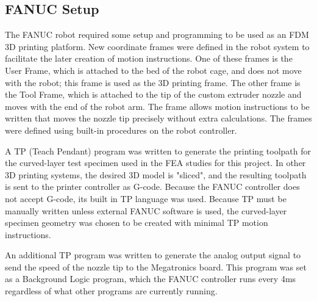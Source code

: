 \subsection*{FANUC Setup}

The FANUC robot required some setup and programming to be used as an FDM 3D printing platform. New coordinate frames were defined in the robot system to facilitate the later creation of motion instructions. One of these frames is the User Frame, which is attached to the bed of the robot cage, and does not move with the robot; this frame is used as the 3D printing frame. The other frame is the Tool Frame, which is attached to the tip of the custom extruder nozzle and moves with the end of the robot arm. The frame allows motion instructions to be written that moves the nozzle tip precisely without extra calculations. The frames were defined using built-in procedures on the robot controller.

A TP (Teach Pendant) program was written to generate the printing toolpath for the curved-layer test specimen used in the FEA studies for this project. In other 3D printing systems, the desired 3D model is "sliced", and the resulting toolpath is sent to the printer controller as G-code. Because the FANUC controller does not accept G-code, its built in TP language was used. Because TP must be manually written unless external FANUC software is used, the curved-layer specimen geometry was chosen to be created with minimal TP motion instructions. 

An additional TP program was written to generate the analog output signal to send the speed of the nozzle tip to the Megatronics board. This program was set as a Background Logic program, which the FANUC controller runs every 4ms regardless of what other programs are currently running. 
